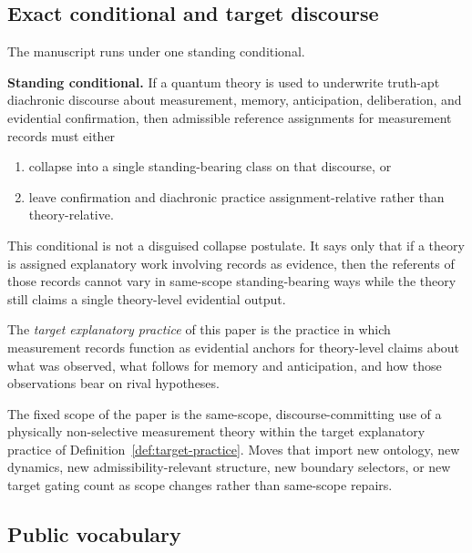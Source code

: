 \subsection{Exact conditional and target discourse}

The manuscript runs under one standing conditional.

\begin{claimbox}
\textbf{Standing conditional.} If a quantum theory is used to underwrite truth-apt diachronic discourse
about measurement, memory, anticipation, deliberation, and evidential confirmation, then
admissible reference assignments for measurement records must either
\begin{enumerate}
    \item collapse into a single standing-bearing class on that discourse, or
    \item leave confirmation and diachronic practice assignment-relative rather than theory-relative.
\end{enumerate}
\end{claimbox}

This conditional is not a disguised collapse postulate. It says only that if a theory is assigned
explanatory work involving records as evidence, then the referents of those records cannot vary in
same-scope standing-bearing ways while the theory still claims a single theory-level evidential output.

\begin{definition}
\label{def:target-practice}
The \emph{target explanatory practice} of this paper is the practice in which measurement records
function as evidential anchors for theory-level claims about what was observed, what follows for
memory and anticipation, and how those observations bear on rival hypotheses.
\end{definition}

\begin{definition}
\label{def:fixed-scope-paper}
The fixed scope of the paper is the same-scope, discourse-committing use of a physically non-selective
measurement theory within the target explanatory practice of Definition~\ref{def:target-practice}.
Moves that import new ontology, new dynamics, new admissibility-relevant structure, new boundary
selectors, or new target gating count as scope changes rather than same-scope repairs.
\end{definition}

\subsection{Public vocabulary}


